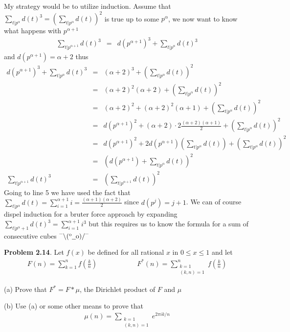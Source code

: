 \documentclass[aps,preprint,preprintnumbers,nofootinbib,showpacs,prd]{revtex4-1}
\newcommand{\nbea}{\begin{eqnarray*}}
\newcommand{\neea}{\end{eqnarray*}}
\newcommand{\dunno}{$ {}^{\mbox {--}}\backslash(^{\rm o}{}\underline{\hspace{0.2cm}}{\rm o})/^{\mbox {--}}$}
\begin{document}
My strategy would be to utilize induction. Assume that $\sum_{t|p^\alpha} d(t)^3 = \left (\sum_{t|p^\alpha} d(t)\right )^2$ is true up to some $p^\alpha$, we now want to know what happens with $p^{\alpha+1}$
%
\nbea
\sum_{t|p^{\alpha+1}} d(t)^3 & = & d(p^{\alpha+1})^3 + \sum_{t|p^\alpha} d(t)^3
\neea
%
and $d(p^{\alpha+1}) = \alpha+2$ thus
%
\nbea
d(p^{\alpha+1})^3 + \sum_{t|p^\alpha} d(t)^3 & = & (\alpha + 2)^3 + \left ( \sum_{t|p^\alpha} d(t)\right )^2 \\
& = & (\alpha + 2)^2(\alpha + 2) + \left ( \sum_{t|p^\alpha} d(t)\right )^2 \\
& = & (\alpha + 2)^2 + (\alpha + 2)^2(\alpha + 1) + \left ( \sum_{t|p^\alpha} d(t)\right )^2 \\
& = & d(p^{\alpha + 1})^2 + (\alpha + 2)\cdot 2 \frac{(\alpha + 2)(\alpha + 1)}{2} + \left ( \sum_{t|p^\alpha} d(t)\right )^2 \\
& = & d(p^{\alpha + 1})^2 + 2 d(p^{\alpha+1})\left (\sum_{t|p^\alpha} d(t) \right ) + \left ( \sum_{t|p^\alpha} d(t)\right )^2 \\
& = & \left ( d(p^{\alpha + 1}) + \sum_{t|p^\alpha} d(t) \right )^2 \\
\sum_{t|p^{\alpha+1}} d(t)^3 & = & \left ( \sum_{t|p^{\alpha+1}} d(t) \right )^2
\neea
%
Going to line 5 we have used the fact that $\sum_{t|p^\alpha} d(t) = \sum_{i=1}^{\alpha+1} i = \frac{(\alpha+1)(\alpha + 2)}{2} $ since $d(p^j) = j+1$. We can of course dispel induction for a bruter force approach by expanding $\sum_{t|p^\alpha+1} d(t)^3 = \sum_{i=1}^{\alpha+1} i^3$ but this requires us to know the formula for a sum of consecutive cubes \dunno

{\bf Problem 2.14}. Let $f(x)$ be defined for all rational $x$ in $0 \le x \le 1$ and let
%
\nbea
F(n) = \sum_{k=1}^n f\left(\frac{k}{n}\right) & ~~~~~~~~~~~~~~~~~~~ & F^*(n) = \sum_{\substack{k=1\\(k,n)=1}}^n f\left(\frac{k}{n}\right)
\neea
%

(a) Prove that $F^* = F * \mu$, the Dirichlet product of $F$ and $\mu$

(b) Use (a) or some other means to prove that
%
\nbea
\mu(n) = \sum_{\substack{k=1\\(k,n)=1}} e^{2\pi i k/n}
\neea
%
\end{document}
